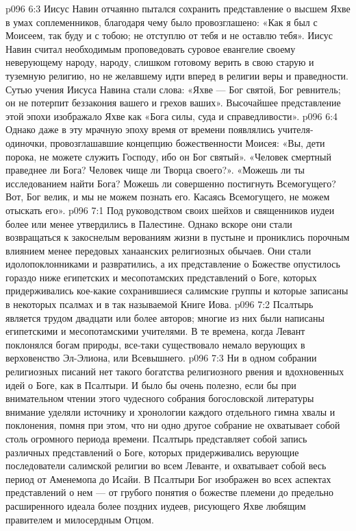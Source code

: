\vs p096 6:3 Иисус Навин отчаянно пытался сохранить представление о высшем Яхве в умах соплеменников, благодаря чему было провозглашено: «Как я был с Моисеем, так буду и с тобою; не отступлю от тебя и не оставлю тебя». Иисус Навин считал необходимым проповедовать суровое евангелие своему неверующему народу, народу, слишком готовому верить в свою старую и туземную религию, но не желавшему идти вперед в религии веры и праведности. Сутью учения Иисуса Навина стали слова: «Яхве --- Бог святой, Бог ревнитель; он не потерпит беззакония вашего и грехов ваших». Высочайшее представление этой эпохи изображало Яхве как «Бога силы, суда и справедливости».
\vs p096 6:4 Однако даже в эту мрачную эпоху время от времени появлялись учителя\hyp{}одиночки, провозглашавшие концепцию божественности Моисея: «Вы, дети порока, не можете служить Господу, ибо он Бог святый». «Человек смертный праведнее ли Бога? Человек чище ли Творца своего?». «Можешь ли ты исследованием найти Бога? Можешь ли совершенно постигнуть Всемогущего? Вот, Бог велик, и мы не можем познать его. Касаясь Всемогущего, не можем отыскать его».
\vs p096 7:1 Под руководством своих шейхов и священников иудеи более или менее утвердились в Палестине. Однако вскоре они стали возвращаться к закоснелым верованиям жизни в пустыне и прониклись порочным влиянием менее передовых ханаанских религиозных обычаев. Они стали идолопоклонниками и развратились, а их представление о Божестве опустилось гораздо ниже египетских и месопотамских представлений о Боге, которых придерживались кое\hyp{}какие сохранившиеся салимские группы и которые записаны в некоторых псалмах и в так называемой Книге Иова.
\vs p096 7:2 \pc Псалтырь является трудом двадцати или более авторов; многие из них были написаны египетскими и месопотамскими учителями. В те времена, когда Левант поклонялся богам природы, все\hyp{}таки существовало немало верующих в верховенство Эл\hyp{}Элиона, или Всевышнего.
\vs p096 7:3 Ни в одном собрании религиозных писаний нет такого богатства религиозного рвения и вдохновенных идей о Боге, как в Псалтыри. И было бы очень полезно, если бы при внимательном чтении этого чудесного собрания богословской литературы внимание уделяли источнику и хронологии каждого отдельного гимна хвалы и поклонения, помня при этом, что ни одно другое собрание не охватывает собой столь огромного периода времени. Псалтырь представляет собой запись различных представлений о Боге, которых придерживались верующие последователи салимской религии во всем Леванте, и охватывает собой весь период от Аменемопа до Исайи. В Псалтыри Бог изображен во всех аспектах представлений о нем --- от грубого понятия о божестве племени до предельно расширенного идеала более поздних иудеев, рисующего Яхве любящим правителем и милосердным Отцом.
